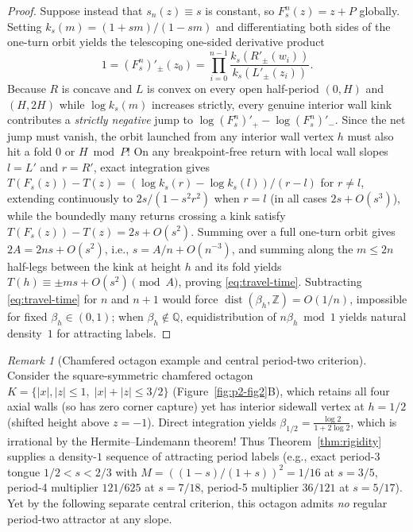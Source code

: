 \documentclass[11pt,reqno]{amsart}
\theoremstyle{definition}
\theoremstyle{remark}
\newtheorem{remark}[theorem]{Remark}
\newcommand{\Z}{\mathbb{Z}}
\newcommand{\Q}{\mathbb{Q}}
\DeclareMathOperator{\dist}{dist}
\begin{document}
\begin{proof}
Suppose instead that $s_n(z) \equiv s$ is constant, so $F_s^n(z) = z + P$ globally. Setting $k_s(m) = (1+sm)/(1-sm)$ and differentiating both sides of the one-turn orbit yields the telescoping one-sided derivative product
\[
  1 = (F_s^n)'_\pm(z_0) = \prod_{i=0}^{n-1} \frac{k_s(R'_\pm(w_i))}{k_s(L'_\pm(z_i))}.
\]
Because $R$ is concave and $L$ is convex on every open half-period $(0, H)$ and $(H, 2H)$ while $\log k_s(m)$ increases strictly, every genuine interior wall kink contributes a \emph{strictly negative} jump to $\log (F_s^n)'_+ - \log (F_s^n)'_-$. Since the net jump must vanish, the orbit launched from any interior wall vertex $h$ must also hit a fold $0$ or $H \bmod P$! On any breakpoint-free return with local wall slopes $l = L'$ and $r = R'$, exact integration gives $T(F_s(z)) - T(z) = (\log k_s(r) - \log k_s(l))/(r - l)$ for $r \ne l$, extending continuously to $2s/(1 - s^2 r^2)$ when $r = l$ (in all cases $2s + O(s^3)$), while the boundedly many returns crossing a kink satisfy $T(F_s(z)) - T(z) = 2s + O(s^2)$. Summing over a full one-turn orbit gives $2A = 2ns + O(s^2)$, i.e., $s = A/n + O(n^{-3})$, and summing along the $m \le 2n$ half-legs between the kink at height $h$ and its fold yields $T(h) \equiv \pm m s + O(s^2) \pmod{A}$, proving \eqref{eq:travel-time}. Subtracting \eqref{eq:travel-time} for $n$ and $n+1$ would force $\dist(\beta_h, \Z) = O(1/n)$, impossible for fixed $\beta_h \in (0,1)$; when $\beta_h \notin \Q$, equidistribution of $n\beta_h \bmod 1$ yields natural density~$1$ for attracting labels.
\end{proof}

\begin{remark}[Chamfered octagon example and central period-two criterion]\label{rem:chamfer-oct}
Consider the square-symmetric chamfered octagon $K = \{|x|,|z| \le 1,\; |x|+|z| \le 3/2\}$ (Figure~\ref{fig:p2-fig2}B), which retains all four axial walls (so has zero corner capture) yet has interior sidewall vertex at $h = 1/2$ (shifted height above $z = -1$). Direct integration yields $\beta_{1/2} = \frac{\log 2}{1 + 2\log 2}$, which is irrational by the Hermite--Lindemann theorem! Thus Theorem~\ref{thm:rigidity} supplies a density-$1$ sequence of attracting period labels (e.g., exact period-3 tongue $1/2 < s < 2/3$ with $M = ((1-s)/(1+s))^2 = 1/16$ at $s = 3/5$, period-4 multiplier $121/625$ at $s = 7/18$, period-5 multiplier $36/121$ at $s = 5/17$). Yet by the following separate central criterion, this octagon admits \emph{no} regular period-two attractor at any slope.
\end{remark}
\end{document}
